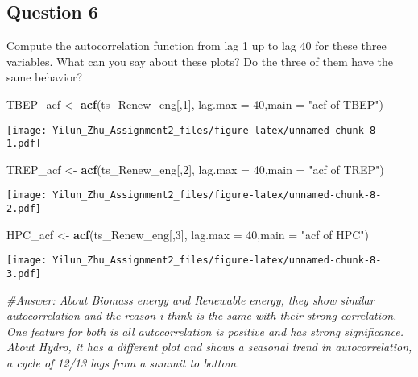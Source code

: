 \documentclass[
]{article}
\newenvironment{Shaded}{\begin{snugshade}}{\end{snugshade}}
\newcommand{\AttributeTok}[1]{\textcolor[rgb]{0.13,0.29,0.53}{#1}}
\newcommand{\CommentTok}[1]{\textcolor[rgb]{0.56,0.35,0.01}{\textit{#1}}}
\newcommand{\DecValTok}[1]{\textcolor[rgb]{0.00,0.00,0.81}{#1}}
\newcommand{\FunctionTok}[1]{\textcolor[rgb]{0.13,0.29,0.53}{\textbf{#1}}}
\newcommand{\NormalTok}[1]{#1}
\newcommand{\OtherTok}[1]{\textcolor[rgb]{0.56,0.35,0.01}{#1}}
\newcommand{\StringTok}[1]{\textcolor[rgb]{0.31,0.60,0.02}{#1}}
\begin{document}
\hypertarget{question-6}{%
\subsection{Question 6}\label{question-6}}

Compute the autocorrelation function from lag 1 up to lag 40 for these
three variables. What can you say about these plots? Do the three of
them have the same behavior?

\begin{Shaded}
\begin{Highlighting}[]
\NormalTok{TBEP\_acf }\OtherTok{\textless{}{-}} \FunctionTok{acf}\NormalTok{(ts\_Renew\_eng[,}\DecValTok{1}\NormalTok{], }\AttributeTok{lag.max =} \DecValTok{40}\NormalTok{,}\AttributeTok{main =} \StringTok{"acf of TBEP"}\NormalTok{)}
\end{Highlighting}
\end{Shaded}

\texttt{[image: Yilun\_Zhu\_Assignment2\_files/figure-latex/unnamed-chunk-8-1.pdf]}

\begin{Shaded}
\begin{Highlighting}[]
\NormalTok{TREP\_acf }\OtherTok{\textless{}{-}} \FunctionTok{acf}\NormalTok{(ts\_Renew\_eng[,}\DecValTok{2}\NormalTok{], }\AttributeTok{lag.max =} \DecValTok{40}\NormalTok{,}\AttributeTok{main =} \StringTok{"acf of TREP"}\NormalTok{)}
\end{Highlighting}
\end{Shaded}

\texttt{[image: Yilun\_Zhu\_Assignment2\_files/figure-latex/unnamed-chunk-8-2.pdf]}

\begin{Shaded}
\begin{Highlighting}[]
\NormalTok{HPC\_acf }\OtherTok{\textless{}{-}} \FunctionTok{acf}\NormalTok{(ts\_Renew\_eng[,}\DecValTok{3}\NormalTok{], }\AttributeTok{lag.max =} \DecValTok{40}\NormalTok{,}\AttributeTok{main =} \StringTok{"acf of HPC"}\NormalTok{)}
\end{Highlighting}
\end{Shaded}

\texttt{[image: Yilun\_Zhu\_Assignment2\_files/figure-latex/unnamed-chunk-8-3.pdf]}

\begin{Shaded}
\begin{Highlighting}[]
\CommentTok{\#Answer: About Biomass energy and Renewable energy, they show similar autocorrelation and the reason i think is the same with their strong correlation. One feature for both is all autocorrelation is positive and has strong significance. About Hydro, it has a different plot and shows a seasonal trend in autocorrelation, a cycle of 12/13 lags from a summit to bottom.}
\end{Highlighting}
\end{Shaded}
\end{document}
